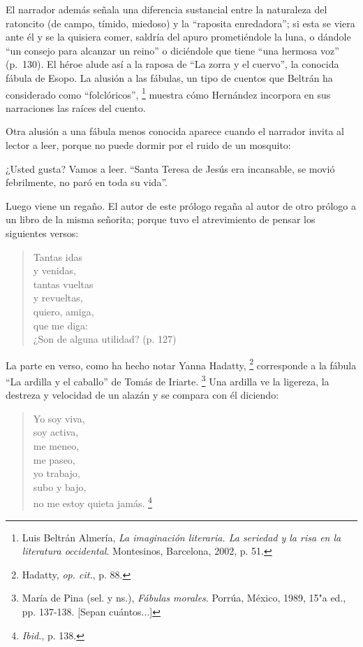 \documentclass[14pt,twoside,final]{extbook} %
\let\oldfootnote\footnote
\renewcommand\footnote[1]{%
\oldfootnote{\hspace{1mm}#1}}
\begin{document}
El narrador además señala una diferencia sustancial entre la naturaleza del ratoncito (de campo, tímido, miedoso) y la ``raposita enredadora''; si esta se viera ante él y se la quisiera comer, saldría del apuro prometiéndole la luna, o dándole ``un consejo para alcanzar un reino'' o diciéndole que tiene ``una hermosa voz'' (p.~130). El héroe alude así a la raposa de ``La zorra y el cuervo'', la conocida fábula de Esopo. La alusión a las fábulas, un tipo de cuentos que Beltrán ha considerado como ``folclóricos'',\footnote{Luis Beltrán Almería, \emph{La imaginación literaria. La seriedad y la risa en la literatura occidental}. Montesinos, Barcelona, 2002, p. 51.} muestra cómo Hernández incorpora en sus narraciones las raíces del cuento.\protect\enlargethispage*{\baselineskip}

Otra alusión a una fábula menos conocida aparece cuando el narrador invita al lector a leer, porque no puede dormir por el ruido de un mosquito:
\begin{quoting}
¿Usted gusta? Vamos a leer. ``Santa Teresa de Jesús era incansable, se movió febrilmente, no paró en toda su vida''.

Luego viene un regaño. El autor de este prólogo regaña al autor de otro prólogo a un libro de la misma señorita; porque tuvo el atrevimiento de pensar los siguientes versos:
\begin{verse}
Tantas idas \\
y venidas, \\
tantas vueltas \\
y revueltas, \\
quiero, amiga, \\
que me diga: \\
¿Son de alguna utilidad? (p. 127)
\end{verse}
\end{quoting}
La parte en verso, como ha hecho notar Yanna Hadatty,\footnote{Hadatty, \emph{op. cit.}, p. 88.} corresponde a la fábula ``La ardilla y el caballo'' de Tomás de Iriarte.\footnote{María de Pina (sel. y ns.), \emph{Fábulas morales}. Porrúa, México, 1989, 15"a ed., pp. 137-138. [Sepan cuántos...]} Una ardilla ve la ligereza, la destreza y velocidad de un alazán y se compara con él
diciendo:
\begin{verse}
Yo soy viva, \\
soy activa, \\
me meneo, \\
me paseo, \\
yo trabajo, \\
subo y bajo, \\
no me estoy quieta jamás.\footnote{\emph{Ibid.}, p. 138.}
\end{verse}
\end{document}
